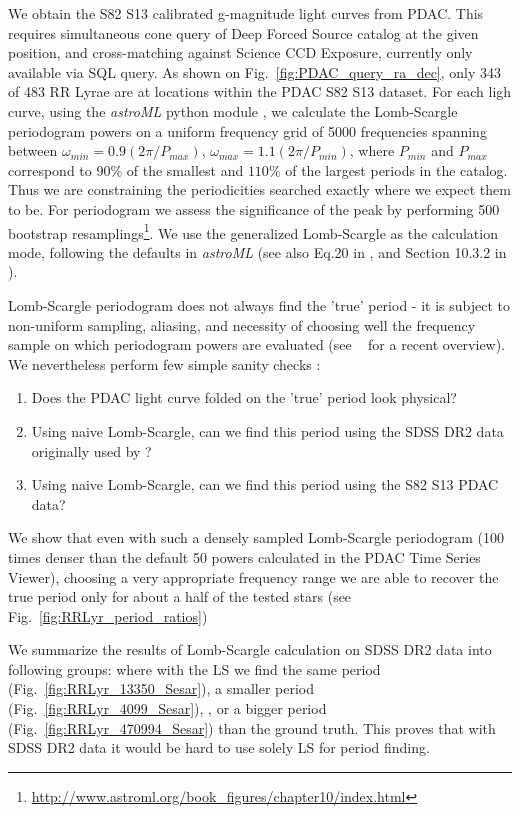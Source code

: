 \documentclass[DM,lsstdraft,toc]{lsstdoc}
\begin{document}
 We obtain the S82 S13 calibrated g-magnitude light curves from PDAC. This requires simultaneous cone query of Deep Forced Source catalog at the given position, and cross-matching against Science CCD Exposure, currently only available via SQL query.  As shown on Fig.~\ref{fig:PDAC_query_ra_dec}, only 343 of 483 RR Lyrae are at locations within the PDAC S82 S13 dataset. For each ligh curve, using the \textit{astroML} python module \citep{VanderPlas:6382200}, we calculate the Lomb-Scargle periodogram powers on a uniform frequency grid of 5000 frequencies spanning between $\omega_{min} = 0.9 ( 2 \pi / P_{max})$, $\omega_{max} = 1.1 ( 2 \pi / P_{min})$, where  $P_{min}$ and $P_{max}$ correspond to $90 \%$ of the smallest and $110\%$ of the largest periods in the catalog. Thus we are constraining the periodicities searched exactly where we expect them to be. For periodogram we assess  the significance of the peak by performing 500 bootstrap resamplings\footnote{\url{http://www.astroml.org/book\_figures/chapter10/index.html}}. We use the generalized Lomb-Scargle as the calculation  mode,  following the defaults in \textit{astroML} (see also Eq.20 in \citep{2009A&A...496..577Z}, and Section 10.3.2 in \citep{2014sdmm.book.....I}).


Lomb-Scargle periodogram does not always find the 'true' period - it is subject to non-uniform sampling,  aliasing,  and necessity of choosing well the frequency sample on which periodogram powers are evaluated (see ~\cite{2017arXiv170309824V} for a recent overview). We nevertheless perform few simple sanity checks :
\begin{enumerate}
  \item  Does the PDAC light curve folded on the 'true' period look physical?
  \item  Using naive Lomb-Scargle, can we find this period using the SDSS DR2 data originally used by \citep{2010ApJ...708..717S}?
  \item  Using naive Lomb-Scargle, can we find this period using the S82 S13 PDAC data?
\end{enumerate}


We show that even with such a densely sampled  Lomb-Scargle periodogram (100 times denser than the default 50 powers calculated in the PDAC Time Series Viewer), choosing a very appropriate frequency range we are able to recover the true period only for about a half of the tested stars (see Fig.~\ref{fig:RRLyr_period_ratios})

We summarize the results of Lomb-Scargle calculation on SDSS DR2 data into following groups: where with the LS we find the same period (Fig.~\ref{fig:RRLyr_13350_Sesar}), a smaller period (Fig.~\ref{fig:RRLyr_4099_Sesar}), , or a bigger period  (Fig.~\ref{fig:RRLyr_470994_Sesar}) than the ground truth. This proves that with SDSS DR2 data it would be hard to use solely LS for period finding.
\end{document}
